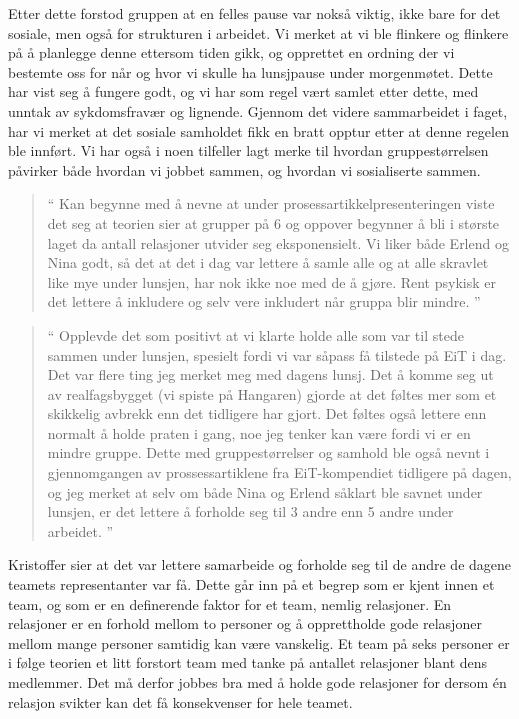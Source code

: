 Etter dette forstod gruppen at en felles pause var nokså viktig, ikke bare for det sosiale, men også for strukturen i arbeidet. Vi merket at vi ble flinkere og flinkere på å planlegge denne ettersom tiden gikk, og opprettet en ordning der vi bestemte oss for når og hvor vi skulle ha lunsjpause under morgenmøtet. Dette har vist seg å fungere godt, og vi har som regel vært samlet etter dette, med unntak av sykdomsfravær og lignende. Gjennom det videre sammarbeidet i faget, har vi merket at det sosiale samholdet fikk en bratt opptur etter at denne regelen ble innført. Vi har også i noen tilfeller lagt merke til hvordan gruppestørrelsen påvirker både hvordan vi jobbet sammen, og hvordan vi sosialiserte sammen. 

\begin{quote}``
Kan begynne med å nevne at under prosessartikkelpresenteringen viste det seg at teorien sier at grupper på 6 og oppover begynner å bli i største laget da antall relasjoner utvider seg eksponensielt. Vi liker både Erlend og Nina godt, så det at det i dag var lettere å samle alle og at alle skravlet like mye under lunsjen, har nok ikke noe med de å gjøre. Rent psykisk er det lettere å inkludere og selv vere inkludert når gruppa blir mindre.
''\end{quote} 

\begin{quote}``
Opplevde det som positivt at vi klarte holde alle som var til stede sammen under lunsjen, spesielt fordi vi var såpass få tilstede på EiT i dag. Det var flere ting jeg merket meg med dagens lunsj. Det å komme seg ut av realfagsbygget (vi spiste på Hangaren) gjorde at det føltes mer som et skikkelig avbrekk enn det tidligere har gjort. Det føltes også lettere enn normalt å holde praten i gang, noe jeg tenker kan være fordi vi er en mindre gruppe. Dette med gruppestørrelser og samhold ble også nevnt i gjennomgangen av prossessartiklene fra EiT-kompendiet tidligere på dagen, og jeg merket at selv om både Nina og Erlend såklart ble savnet under lunsjen, er det lettere å forholde seg til 3 andre enn 5 andre under arbeidet.
''\end{quote} 

Kristoffer sier at det var lettere samarbeide og forholde seg til de andre de dagene teamets representanter var få. 
Dette går inn på et begrep som er kjent innen et team, og som er en definerende faktor for et team, nemlig relasjoner. 
En relasjoner er en forhold mellom to personer og å opprettholde gode relasjoner mellom mange personer samtidig
kan være vanskelig. Et team på seks personer er i følge teorien  \cite{Artikkel4} et litt forstort team med tanke på antallet relasjoner
blant dens medlemmer. Det må derfor jobbes bra med å holde gode relasjoner for dersom én relasjon svikter kan det få 
konsekvenser for hele teamet. 

